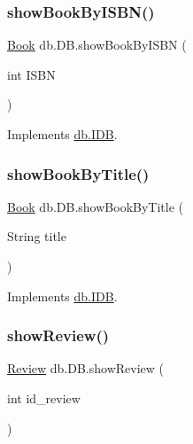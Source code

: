 \mbox{\label{classdb_1_1_d_b_ae902ce95ca7433f1f7f77419f4121f4c}} 
\subsubsection{\texorpdfstring{show\+Book\+By\+I\+S\+B\+N()}{showBookByISBN()}}
{\footnotesize\ttfamily \hyperlink{classserver_1_1data_1_1_book}{Book} db.\+D\+B.\+show\+Book\+By\+I\+S\+BN (\begin{DoxyParamCaption}\item[{int}]{I\+S\+BN }\end{DoxyParamCaption})}



Implements \hyperlink{interfacedb_1_1_i_d_b_aed305f6c36ff140084636a8eded479db}{db.\+I\+DB}.

\mbox{\label{classdb_1_1_d_b_a22a4c5b98facd4506b03828697220773}} 
\subsubsection{\texorpdfstring{show\+Book\+By\+Title()}{showBookByTitle()}}
{\footnotesize\ttfamily \hyperlink{classserver_1_1data_1_1_book}{Book} db.\+D\+B.\+show\+Book\+By\+Title (\begin{DoxyParamCaption}\item[{String}]{title }\end{DoxyParamCaption})}



Implements \hyperlink{interfacedb_1_1_i_d_b_a6418edaf7c25f99f0422c0000db521fa}{db.\+I\+DB}.

\mbox{\label{classdb_1_1_d_b_a84b36a9e2c155b1aa2868844cd157df7}} 
\subsubsection{\texorpdfstring{show\+Review()}{showReview()}}
{\footnotesize\ttfamily \hyperlink{classserver_1_1data_1_1_review}{Review} db.\+D\+B.\+show\+Review (\begin{DoxyParamCaption}\item[{int}]{id\+\_\+review }\end{DoxyParamCaption})}



